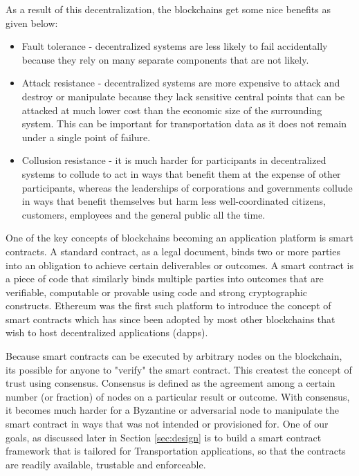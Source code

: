 As a result of this decentralization, the blockchains get some nice benefits as given below:
\begin{itemize}

    \item Fault tolerance - decentralized systems are less likely to fail accidentally because they rely on many separate
components that are not likely.
    \item Attack resistance - decentralized systems are more expensive to attack and destroy or manipulate because they lack
sensitive central points that can be attacked at much lower cost than the economic size of the surrounding system. This
can be important for transportation data as it does not remain under a single point of failure.
    \item Collusion resistance - it is much harder for participants in decentralized systems to collude to act in ways that
benefit them at the expense of other participants, whereas the leaderships of corporations and governments collude in
ways that benefit themselves but harm less well-coordinated citizens, customers, employees and the general public all
the time.
\end{itemize}

One of the key concepts of blockchains becoming an application platform is smart contracts. A standard contract, as a
legal document, binds two or more parties into an obligation to achieve certain deliverables or outcomes. A smart
contract is a piece of code that similarly binds multiple parties into outcomes that are verifiable, computable or
provable using code and strong cryptographic constructs. Ethereum was the first such platform to introduce the concept
of smart contracts which has since been adopted by most other blockchains that wish to host decentralized applications
(dapps).

Because smart contracts can be executed by arbitrary nodes on the blockchain, its possible for anyone to "verify" the
smart contract. This createst the concept of trust using consensus. Consensus is defined as the agreement among a
certain number (or fraction) of nodes on a particular result or outcome. With consensus, it becomes much harder for a
Byzantine or adversarial node \cite{lamport_byz} to manipulate the smart contract in ways that was not intended or
provisioned for. One of our goals, as discussed later in Section \ref{sec:design} is to build a smart contract framework
that is tailored for Transportation applications, so that the contracts are readily available, trustable and
enforceable. 

